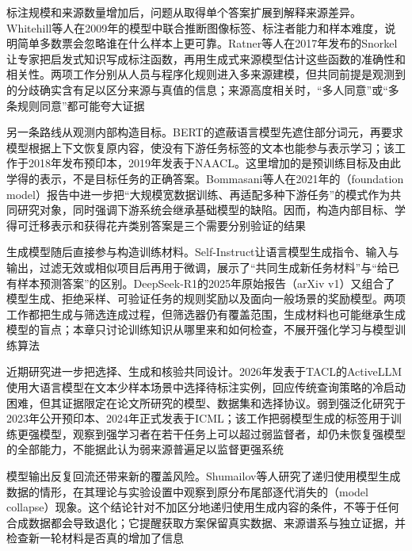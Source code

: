 标注规模和来源数量增加后，问题从取得单个答案扩展到解释来源差异。Whitehill等人在2009年的模型中联合推断图像标签、标注者能力和样本难度，说明简单多数票会忽略谁在什么样本上更可靠。Ratner等人在2017年发布的Snorkel让专家把启发式知识写成标注函数，再用生成式来源模型估计这些函数的准确性和相关性。两项工作分别从人员与程序化规则进入多来源建模，但共同前提是观测到的分歧确实含有足以区分来源与真值的信息；来源高度相关时，“多人同意”或“多条规则同意”都可能夸大证据

\Needspace{110mm}
另一条路线从观测内部构造目标。BERT的遮蔽语言模型先遮住部分词元，再要求模型根据上下文恢复原内容，使没有下游任务标签的文本也能参与表示学习；该工作于2018年发布预印本，2019年发表于NAACL。这里增加的是预训练目标及由此学得的表示，不是目标任务的正确答案。Bommasani等人在2021年的（foundation model）报告中进一步把“大规模宽数据训练、再适配多种下游任务”的模式作为共同研究对象，同时强调下游系统会继承基础模型的缺陷。因而，构造内部目标、学得可迁移表示和获得花卉类别答案是三个需要分别验证的结果

生成模型随后直接参与构造训练材料。Self-Instruct让语言模型生成指令、输入与输出，过滤无效或相似项目后再用于微调，展示了“共同生成新任务材料”与“给已有样本预测答案”的区别。DeepSeek-R1的2025年原始报告（arXiv v1）又组合了模型生成、拒绝采样、可验证任务的规则奖励以及面向一般场景的奖励模型。两项工作都把生成与筛选连成过程，但筛选器仍有覆盖范围，生成材料也可能继承生成模型的盲点；本章只讨论训练知识从哪里来和如何检查，不展开强化学习与模型训练算法

\Needspace{150mm}
近期研究进一步把选择、生成和核验共同设计。2026年发表于TACL的ActiveLLM使用大语言模型在文本少样本场景中选择待标注实例，回应传统查询策略的冷启动困难，但其证据限定在论文所研究的模型、数据集和选择协议。弱到强泛化研究于2023年公开预印本、2024年正式发表于ICML；该工作把弱模型生成的标签用于训练更强模型，观察到强学习者在若干任务上可以超过弱监督者，却仍未恢复强模型的全部能力，不能据此认为弱来源普遍足以监督更强系统

模型输出反复回流还带来新的覆盖风险。Shumailov等人研究了递归使用模型生成数据的情形，在其理论与实验设置中观察到原分布尾部逐代消失的（model collapse）现象。这个结论针对不加区分地递归使用生成内容的条件，不等于任何合成数据都会导致退化；它提醒获取方案保留真实数据、来源谱系与独立证据，并检查新一轮材料是否真的增加了信息

